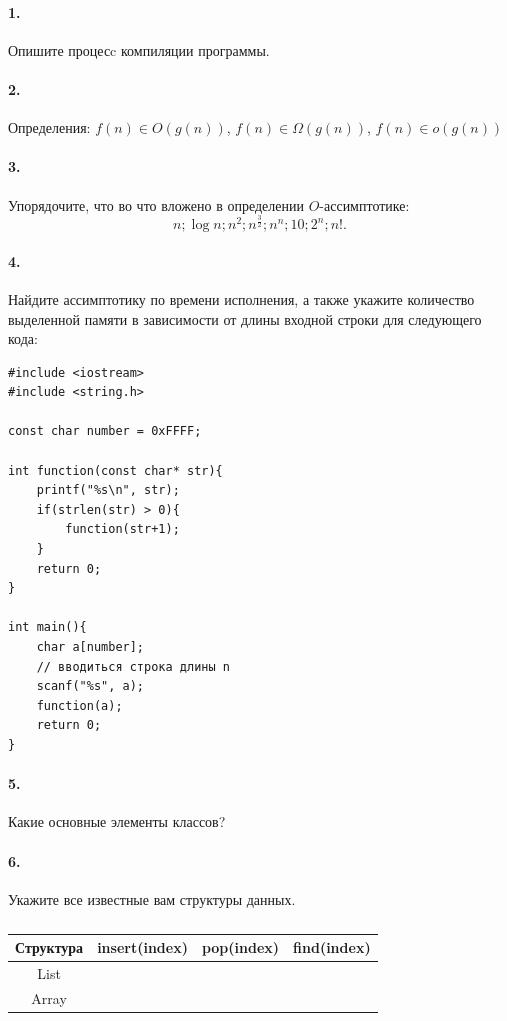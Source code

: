 \documentclass[12pt, twoside]{article}
\begin{document}
 

\paragraph{1.} Опишите процесc компиляции программы.

\paragraph{2.} Определения: $f\left(n\right) \in O\left(g\left(n\right)\right)$, $f\left(n\right) \in \Omega\left(g\left(n\right)\right)$, $f\left(n\right) \in o\left(g\left(n\right)\right)$

\paragraph{3.} Упорядочите, что во что вложено в определении $O$-ассимптотике:
$$n; \log n; n^2; n^{\frac{3}{2}}; n^n; 10; 2^n; n!.$$

\paragraph{4.} Найдите ассимптотику по времени исполнения, а также укажите количество выделенной памяти в зависимости от длины входной строки для следующего кода:

\begin{verbatim}
#include <iostream>
#include <string.h>

const char number = 0xFFFF;

int function(const char* str){
    printf("%s\n", str);
    if(strlen(str) > 0){
        function(str+1);
    }
    return 0;
}

int main(){
    char a[number];
    // вводиться строка длины n
    scanf("%s", a);
    function(a);
    return 0;
}
\end{verbatim}

\paragraph{5.} Какие основные элементы классов?

\paragraph{6.} Укажите все известные вам структуры данных.

\begin{table}[h!]
\begin{center}
\caption{}
\label{table1}
\begin{tabular}{|c|c|c|c|}
\hline
Структура	&insert(index)	&pop(index)	&find(index)\\
\hline
List			&			&			&\\
\hline
Array		&			&			&\\
\hline
\end{tabular}
\end{center}
\end{table}
\end{document}
